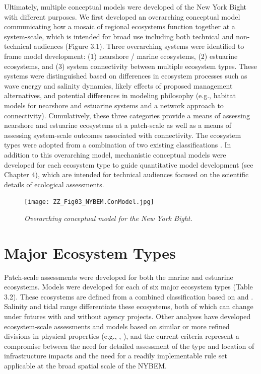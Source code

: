\documentclass[
]{book}
\begin{document}
Ultimately, multiple conceptual models were developed of the New York Bight with different purposes. We first developed an overarching conceptual model communicating how a mosaic of regional ecosystems function together at a system-scale, which is intended for broad use including both technical and non-technical audiences (Figure 3.1). Three overarching systems were identified to frame model development: (1) nearshore / marine ecosystems, (2) estuarine ecosystems, and (3) system connectivity between multiple ecosystem types. These systems were distinguished based on differences in ecosystem processes such as wave energy and salinity dynamics, likely effects of proposed management alternatives, and potential differences in modeling philosophy (e.g., habitat models for nearshore and estuarine systems and a network approach to connectivity). Cumulatively, these three categories provide a means of assessing nearshore and estuarine ecosystems at a patch-scale as well as a means of assessing system-scale outcomes associated with connectivity. The ecosystem types were adopted from a combination of two existing classifications \citep{cowardin_classification_1979, us_fish_and_wildlife_service_usfws_significant_1997}. In addition to this overarching model, mechanistic conceptual models were developed for each ecosystem type to guide quantitative model development (see Chapter 4), which are intended for technical audiences focused on the scientific details of ecological assessments.

\begin{figure}
\centering
\texttt{[image: ZZ\_Fig03\_NYBEM.ConModel.jpg]}
\caption{\emph{Overarching conceptual model for the New York Bight.}}
\end{figure}

\hypertarget{major-ecosystem-types}{%
\section{Major Ecosystem Types}\label{major-ecosystem-types}}

Patch-scale assessments were developed for both the marine and estuarine ecosystems. Models were developed for each of six major ecosystem types (Table 3.2). These ecosystems are defined from a combined classification based on \citet{cowardin_classification_1979} and \citet{us_fish_and_wildlife_service_usfws_significant_1997}. Salinity and tidal range differentiate these ecosystems, both of which can change under futures with and without agency projects. Other analyses have developed ecosystem-scale assessments and models based on similar or more refined divisions in physical properties (e.g., \citet{clough_modeling_2016}, \citet{fischbach_building_2018}), and the current criteria represent a compromise between the need for detailed assessment of the type and location of infrastructure impacts and the need for a readily implementable rule set applicable at the broad spatial scale of the NYBEM.
\end{document}
